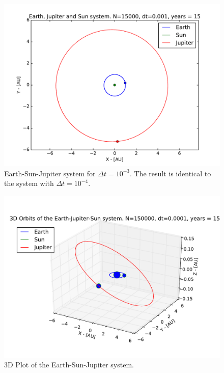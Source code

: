 \documentclass{article}
\begin{document}
\begin{figure}[!h]
\centering
\includegraphics[width=\linewidth]{Plots/Earth_Sun_Jupiter_largerdt.pdf}
\caption{Earth-Sun-Jupiter system for $\Delta t = 10^{-3}$. The result is identical to the system with $\Delta t = 10^{-4}$.}
\label{fig:ESJ_stability}
\end{figure}
\begin{figure}[!h]
\centering
\includegraphics[width=\linewidth]{Plots/Earth_Sun_Jupiter_3D.pdf}
\caption{3D Plot of the Earth-Sun-Jupiter system.}
\label{fig:Appendix_3D_ESJ}
\end{figure}
\end{document}
